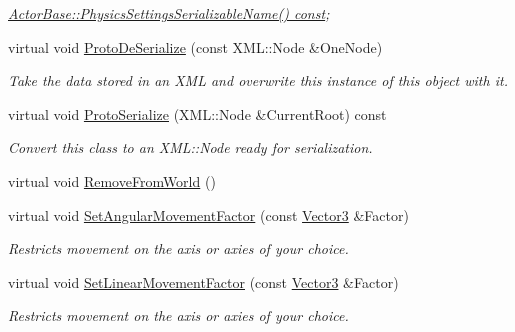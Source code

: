 \begin{DoxyCompactItemize}
\begin{DoxyCompactList}\small\item\em \hyperlink{classMezzanine_1_1ActorBase_a7a18ac81a996e2d68057223ebbc7959c}{Actor\-Base\-::\-Physics\-Settings\-Serializable\-Name() const}; \end{DoxyCompactList}\item 
virtual void \hyperlink{classMezzanine_1_1ActorRigid_abec93275a1d839ade34a142b090aea31}{Proto\-De\-Serialize} (const X\-M\-L\-::\-Node \&One\-Node)
\begin{DoxyCompactList}\small\item\em Take the data stored in an X\-M\-L and overwrite this instance of this object with it. \end{DoxyCompactList}\item 
virtual void \hyperlink{classMezzanine_1_1ActorRigid_ade9a85694db00bca2167fa95350086cc}{Proto\-Serialize} (X\-M\-L\-::\-Node \&Current\-Root) const 
\begin{DoxyCompactList}\small\item\em Convert this class to an X\-M\-L\-::\-Node ready for serialization. \end{DoxyCompactList}\item 
virtual void \hyperlink{classMezzanine_1_1ActorRigid_a5017e2809d6dc2516b3675748ce80b2e}{Remove\-From\-World} ()
\begin{DoxyCompactList}\small\item\em \end{DoxyCompactList}\item 
virtual void \hyperlink{classMezzanine_1_1ActorRigid_ab68facc031fc3212f4169d2b93a72378}{Set\-Angular\-Movement\-Factor} (const \hyperlink{classMezzanine_1_1Vector3}{Vector3} \&Factor)
\begin{DoxyCompactList}\small\item\em Restricts movement on the axis or axies of your choice. \end{DoxyCompactList}\item 
virtual void \hyperlink{classMezzanine_1_1ActorRigid_a0dc1820d0fa2d1128b03149da025f40f}{Set\-Linear\-Movement\-Factor} (const \hyperlink{classMezzanine_1_1Vector3}{Vector3} \&Factor)
\begin{DoxyCompactList}\small\item\em Restricts movement on the axis or axies of your choice. \end{DoxyCompactList}\end{DoxyCompactItemize}
